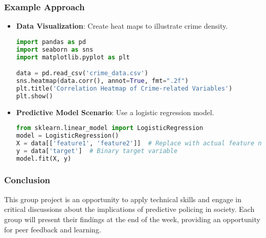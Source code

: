 \documentclass[aspectratio=169]{beamer}
\begin{document}
\begin{frame}[fragile]
    \frametitle{Example Approach}
    \begin{itemize}
        \item \textbf{Data Visualization}: 
        Create heat maps to illustrate crime density.
        \begin{lstlisting}[language=Python]
import pandas as pd
import seaborn as sns
import matplotlib.pyplot as plt

data = pd.read_csv('crime_data.csv')
sns.heatmap(data.corr(), annot=True, fmt=".2f")
plt.title('Correlation Heatmap of Crime-related Variables')
plt.show()
        \end{lstlisting}
        
        \item \textbf{Predictive Model Scenario}:
        Use a logistic regression model.
        \begin{lstlisting}[language=Python]
from sklearn.linear_model import LogisticRegression
model = LogisticRegression()
X = data[['feature1', 'feature2']]  # Replace with actual feature names
y = data['target']  # Binary target variable
model.fit(X, y)
        \end{lstlisting}
    \end{itemize}
\end{frame}

\begin{frame}[fragile]
    \frametitle{Conclusion}
    This group project is an opportunity to apply technical skills and engage in critical discussions about the implications of predictive policing in society. Each group will present their findings at the end of the week, providing an opportunity for peer feedback and learning.
\end{frame}
\end{document}
